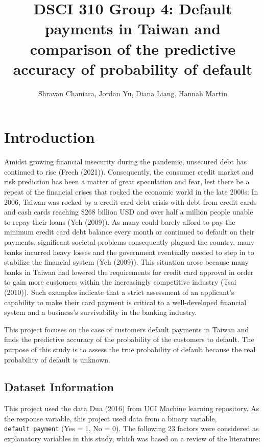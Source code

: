 \documentclass[
]{article}
\title{DSCI 310 Group 4: Default payments in Taiwan and comparison of
the predictive accuracy of probability of default}
\author{Shravan Chaniara, Jordan Yu, Diana Liang, Hannah Martin}
\date{}
\begin{document}
\maketitle

\hypertarget{introduction}{%
\section{Introduction}\label{introduction}}

Amidst growing financial insecurity during the pandemic, unsecured debt
has continued to rise (Frech (2021)). Consequently, the consumer credit
market and risk prediction has been a matter of great speculation and
fear, lest there be a repeat of the financial crises that rocked the
economic world in the late 2000s: In 2006, Taiwan was rocked by a credit
card debt crisis with debt from credit cards and cash cards reaching
\$268 billion USD and over half a million people unable to repay their
loans (Yeh (2009)). As many could barely afford to pay the minimum
credit card debt balance every month or continued to default on their
payments, significant societal problems consequently plagued the
country, many banks incurred heavy losses and the government eventually
needed to step in to stabilize the financial system (Yeh (2009)). This
situation arose because many banks in Taiwan had lowered the
requirements for credit card approval in order to gain more customers
within the increasingly competitive industry (Tsai (2010)). Such
examples indicate that a strict assessment of an applicant's capability
to make their card payment is critical to a well-developed financial
system and a business's survivability in the banking industry.

This project focuses on the case of customers default payments in Taiwan
and finds the predictive accuracy of the probability of the customers to
default. The purpose of this study is to assess the true probability of
default because the real probability of default is unknown.

\hypertarget{dataset-information}{%
\subsection{Dataset Information}\label{dataset-information}}

This project used the data Dua (2016) from UCI Machine learning
repository. As the response variable, this project used data from a
binary variable, \texttt{default\ payment} (Yes = 1, No = 0). The
following 23 factors were considered as explanatory variables in this
study, which was based on a review of the literature:
\end{document}
